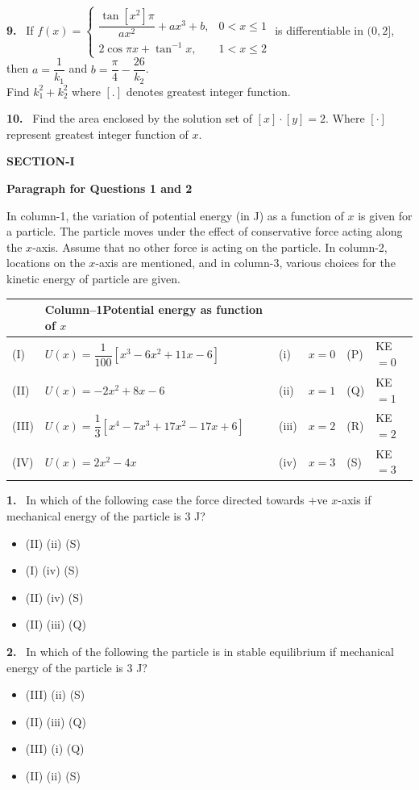 \documentclass[10pt]{extarticle}
\newcommand{\papersec}[1]{\par\bigskip{\centering\Large\bfseries PAPER-#1\par}\medskip}
\newcommand{\partsec}[2]{\par\medskip\noindent{\large\bfseries PART-#1: #2}\par\smallskip}
\newcommand{\sect}[1]{\par\smallskip\noindent\textbf{#1}\par}
\newcommand{\qn}[1]{\par\smallskip\noindent\textbf{#1.}~}
\newcommand{\paraq}[2]{\par\smallskip\noindent\textbf{Paragraph for Questions #1 and #2}\par}
\newenvironment{qoptions}{\begin{itemize}[leftmargin=1.8em,itemsep=1pt,topsep=2pt,label={}]}{\end{itemize}}
\newcommand{\opt}[2]{\item[(#1)] #2}
\begin{document}
\begin{multicols}{2}
\qn{9} If $f(x)=\begin{cases}\dfrac{\tan[x^2]\pi}{ax^2}+ax^3+b, & 0<x\le1\\[6pt] 2\cos\pi x+\tan^{-1}x, & 1<x\le2\end{cases}$ is differentiable in $(0,2]$, then $a=\dfrac1{k_1}$ and $b=\dfrac\pi4-\dfrac{26}{k_2}$.\\
Find $k_1^2+k_2^2$ {where $[.]$ denotes greatest integer function}.

\qn{10} Find the area enclosed by the solution set of $[x]\cdot[y]=2$. Where $[\cdot]$ represent greatest integer function of $x$.

\papersec{2}
\partsec{1}{PHYSICS}
\sect{SECTION-I}
\end{multicols}
\noindent\begin{minipage}{\textwidth}
\paraq{1}{2}
In column-1, the variation of potential energy (in J) as a function of $x$ is given for a particle. The particle moves under the effect of conservative force acting along the $x$-axis. Assume that no other force is acting on the particle. In column-2, locations on the $x$-axis are mentioned, and in column-3, various choices for the kinetic energy of particle are given.
\begin{center}\footnotesize
\begin{tabular}{|p{0.7cm}|p{5.2cm}|p{0.7cm}|p{2.2cm}|p{0.7cm}|p{2.4cm}|}
\hline
 & \centering Column--1\newline Potential energy as function of $x$ &  & \\
\hline
(I) & $U(x)=\dfrac1{100}\left[x^3-6x^2+11x-6\right]$ & (i) & $x=0$ & (P) & KE $=0$\\
(II) & $U(x)=-2x^2+8x-6$ & (ii) & $x=1$ & (Q) & KE $=1$\\
(III) & $U(x)=\dfrac13\left[x^4-7x^3+17x^2-17x+6\right]$ & (iii) & $x=2$ & (R) & KE $=2$\\
(IV) & $U(x)=2x^2-4x$ & (iv) & $x=3$ & (S) & KE $=3$\\
\hline
\end{tabular}
\end{center}
\end{minipage}
\begin{multicols}{2}

\qn{1} In which of the following case the force directed towards $+$ve $x$-axis if mechanical energy of the particle is 3 J?
\begin{qoptions}
\opt{A}{(II) (ii) (S)}
\opt{B}{(I) (iv) (S)}
\opt{C}{(II) (iv) (S)}
\opt{D}{(II) (iii) (Q)}
\end{qoptions}

\qn{2} In which of the following the particle is in stable equilibrium if mechanical energy of the particle is 3 J?
\begin{qoptions}
\opt{A}{(III) (ii) (S)}
\opt{B}{(II) (iii) (Q)}
\opt{C}{(III) (i) (Q)}
\opt{D}{(II) (ii) (S)}
\end{qoptions}

\end{multicols}
\end{document}
